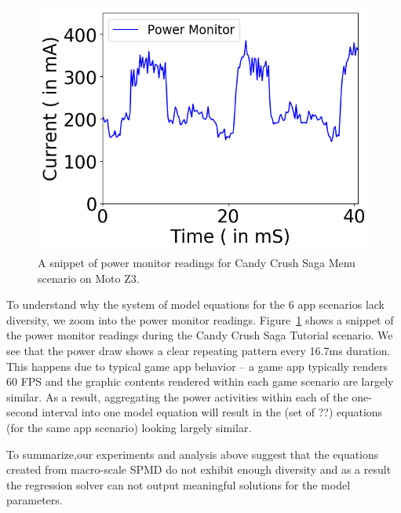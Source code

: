 \begin{figure}[tp]
    \centering
    \includegraphics[width=0.50\columnwidth]{figures/candy_crush_saga_tutorial_timeline.png}
    \vspace{-0.1in}
    \caption{A snippet of power monitor readings for Candy Crush Saga Menu scenario on Moto Z3.}
    \label{fig:power_trace_candycrushturorial}
    \vspace{-0.1in}
\end{figure}

To understand why the system of model equations for the 6 app scenarios lack diversity, 
we zoom into the power monitor readings. Figure~\ref{fig:power_trace_candycrushturorial}
shows a snippet of the power monitor readings during the Candy Crush Saga Tutorial scenario. 
We see that the power draw shows a clear repeating pattern every 16.7ms duration.
This happens due to typical game app behavior -- a game app typically
renders 60 FPS and the graphic contents rendered within each game scenario are largely similar.
As a result, aggregating the power activities within each of the one-second interval into one model equation
will result in the (set of ??) equations (for the same app scenario) looking largely similar. 


To summarize,our experiments and analysis above suggest
that the equations created from macro-scale SPMD do not exhibit enough diversity 
and as a result the regression solver can not output meaningful solutions for the model parameters.

